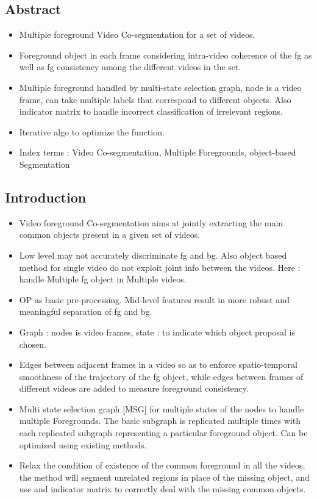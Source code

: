 \documentclass{article}
\begin{document}
\subsection{Abstract}
\begin{itemize}
\item Multiple foreground Video Co-segmentation for a set of videos.
\item Foreground object in each frame considering intra-video coherence of the fg as well as fg consistency among the different videos in the set.
\item Multiple foreground handled by multi-state selection graph, node is a video frame, can take multiple labels that correspond to different objects. Also indicator matrix to handle incorrect classification of irrelevant regions.
\item Iterative algo to optimize the function.
\item Index terms : Video Co-segmentation, Multiple Foregrounds, object-based Segmentation
\end{itemize}

\subsection{Introduction}
\begin{itemize}
\item Video foreground Co-segmentation aims at jointly extracting the main common objects present in a given set of videos.
\item Low level may not accurately discriminate fg and bg. Also object based method for single video do not exploit joint info between the videos. Here : handle Multiple fg object in Multiple videos.
\item OP as basic pre-processing. Mid-level features result in more robust and meaningful separation of fg and bg.
\item Graph : nodes is video frames, state : to indicate which object proposal is chosen.
\item Edges between adjacent frames in a video so as to enforce spatio-temporal smoothness of the trajectory of the fg object, while edges between frames of different videos are added to measure foreground consistency.
\item Multi state selection graph [MSG] for multiple states of the nodes to handle multiple Foregrounds. The basic subgraph is replicated multiple times with each replicated subgraph representing a particular foreground object. Can be optimized using existing methods.
\item Relax the condition of existence of the common foreground in all the videos, the method will segment unrelated regions in place of the missing object, and use and indicator matrix to correctly deal with the missing common objects.
\end{itemize}
\end{document}

